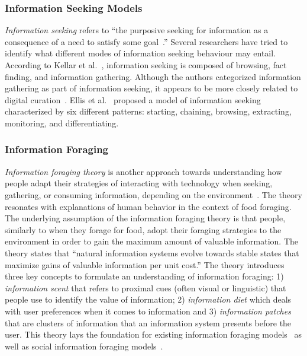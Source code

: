 \documentclass{sigchi}
\begin{document}
\subsubsection{Information Seeking Models}
\textit{Information seeking} refers to ``the purposive seeking for information as a consequence of a need to satisfy some goal~\cite{wilson2000human}.'' Several researchers have tried to identify what different modes of information seeking behaviour may entail. According to Kellar et al.~\cite{kellar2006goal}, information seeking is composed of browsing, fact finding, and information gathering. Although the authors categorized information gathering as part of information seeking, it appears to be more closely related to digital curation~\cite{beagrie2008digital,whittaker2011personal}. 
Ellis et al.~\cite{ellis1989behavioural,ellis1993comparison,ellis1997modelling} proposed a model of information seeking characterized by six different patterns: starting, chaining, browsing, extracting, monitoring, and differentiating. 

\subsubsection{Information Foraging}
\textit{Information foraging theory} is another approach towards understanding how people adapt their strategies of interacting with technology when seeking, gathering, or consuming information, depending on the environment~\cite{pirolli1999information}. The theory resonates with explanations of human behavior in the context of food foraging. The underlying assumption of the information foraging theory is that people, similarly to when they forage for food, adopt their foraging strategies to the environment in order to gain the maximum amount of valuable information. The theory states that ``natural information systems evolve towards stable states that maximize gains of valuable information per unit cost.''
%
The theory introduces three key concepts to formulate an understanding of information foraging: 
1) \textit{information scent} that refers to proximal cues (often visual or linguistic) that people use to identify the value of information; 2) \textit{information diet} which deals with user preferences when it comes to information and 3) \textit{information patches} that are clusters of information that an information system presents before the user. This theory lays the foundation for existing information foraging models~\cite{fu2007snif,kitajima2000comprehension} as well as social information foraging models~\cite{pirolli2009elementary,fu2008microstructures}.  
\end{document}

